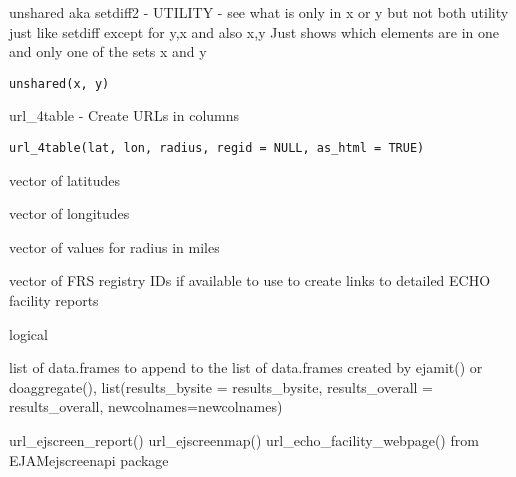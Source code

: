 \documentclass[a4paper]{book}
\begin{document}
%
\begin{Description}\relax
unshared aka setdiff2 - UTILITY - see what is only in x or y but not both
utility just like setdiff except for y,x and also x,y
Just shows which elements are in one and only one of the sets x and y
\end{Description}
%
\begin{Usage}
\begin{verbatim}
unshared(x, y)
\end{verbatim}
\end{Usage}
%
\begin{Description}\relax
url\_4table - Create URLs in columns
\end{Description}
%
\begin{Usage}
\begin{verbatim}
url_4table(lat, lon, radius, regid = NULL, as_html = TRUE)
\end{verbatim}
\end{Usage}
%
\begin{Arguments}
\begin{ldescription}
\item[\code{lat}] vector of latitudes

\item[\code{lon}] vector of longitudes

\item[\code{radius}] vector of values for radius in miles

\item[\code{regid}] vector of FRS registry IDs if available to use to create links to detailed ECHO facility reports

\item[\code{as\_html}] logical
\end{ldescription}
\end{Arguments}
%
\begin{Value}
list of data.frames to append to the list of data.frames created by ejamit() or doaggregate(),
list(results\_bysite = results\_bysite, results\_overall = results\_overall, newcolnames=newcolnames)
\end{Value}
%
\begin{SeeAlso}\relax
url\_ejscreen\_report() url\_ejscreenmap() url\_echo\_facility\_webpage() from EJAMejscreenapi package
\end{SeeAlso}
\end{document}
